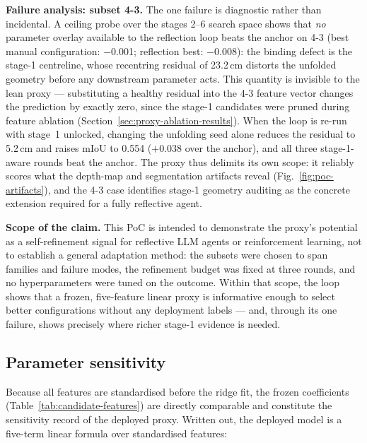 \documentclass[a4paper,fleqn]{cas-dc}
\begin{document}
\textbf{Failure analysis: subset 4-3.} The one failure is diagnostic rather
than incidental. A ceiling probe over the stages 2--6 search space shows that
\emph{no} parameter overlay available to the reflection loop beats the anchor
on 4-3 (best manual configuration: $-$0.001; reflection best: $-$0.008): the
binding defect is the stage-1 centreline, whose recentring residual of
23.2\,cm distorts the unfolded geometry before any downstream parameter acts.
This quantity is invisible to the lean proxy --- substituting a healthy
residual into the 4-3 feature vector changes the prediction by exactly zero,
since the stage-1 candidates were pruned during feature ablation
(Section~\ref{sec:proxy-ablation-results}). When the loop is re-run with
stage~1 unlocked, changing the unfolding seed alone reduces the residual to
5.2\,cm and raises mIoU to 0.554 ($+$0.038 over the anchor), and all three
stage-1-aware rounds beat the anchor. The proxy thus delimits its own scope:
it reliably scores what the depth-map and segmentation artifacts reveal
(Fig.~\ref{fig:poc-artifacts}), and the 4-3 case identifies stage-1 geometry
auditing as the concrete extension required for a fully reflective agent.

\textbf{Scope of the claim.} This PoC is intended to demonstrate the proxy's
potential as a self-refinement signal for reflective LLM agents or
reinforcement learning, not to establish a general adaptation method: the
subsets were chosen to span families and failure modes, the refinement budget
was fixed at three rounds, and no hyperparameters were tuned on the outcome.
Within that scope, the loop shows that a frozen, five-feature linear proxy is
informative enough to select better configurations without any deployment
labels --- and, through its one failure, shows precisely where richer stage-1
evidence is needed.

\subsection{Parameter sensitivity}\label{sec:sensitivity}

Because all features are standardised before the ridge fit, the frozen
coefficients (Table~\ref{tab:candidate-features}) are directly comparable and
constitute the sensitivity record of the deployed proxy. Written out, the
deployed model is a five-term linear formula over standardised features:
\end{document}
